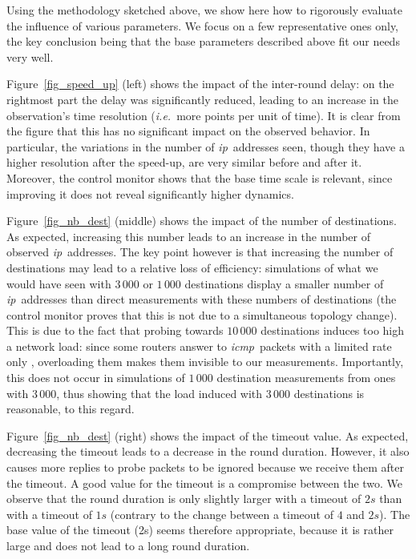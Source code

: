 \documentclass[times, 10pt,twocolumn]{article}
\newcommand{\ie}{{\em i.e.}}
\newcommand{\ip}{\mbox{\em \sc ip}}
\newcommand{\icmp}{{\em \sc icmp}}
\begin{document}
Using the methodology sketched above, we show here how to rigorously evaluate the influence of various parameters. We focus on a few representative ones only, the key conclusion being that the base parameters described above fit our needs very well.

Figure~\ref{fig_speed_up} (left) shows the impact of the inter-round delay: on the rightmost part the delay was significantly reduced, leading to an increase in the observation's time resolution (\ie\ more points per unit of time). It is clear from the figure that this has no significant impact on the observed behavior. In particular, the variations in the number of \ip\ addresses seen, though they have a higher resolution after the speed-up, are very similar before and after it. Moreover, the control monitor shows that the base time scale is relevant, since improving it does not reveal significantly higher dynamics.

Figure~\ref{fig_nb_dest} (middle) shows the impact of the number of
destinations. As expected, increasing this number leads to an increase
in the number of observed \ip\ addresses.
The key point however is that increasing
the number of destinations may lead to a relative loss of efficiency:
simulations of what we would have seen with $3\,000$ or $1\,000$
destinations display a smaller number of \ip\ addresses than direct
measurements with these numbers of destinations (the control monitor
proves that this is not due to a simultaneous topology change). This
is due to the fact that probing towards $10\,000$ destinations induces
too high a network load: since some routers answer to \icmp\ packets
with a limited rate only \cite{govindan2002estimating}, overloading
them makes them invisible to our measurements. Importantly, this does
not occur in simulations of $1\,000$ destination measurements from
ones with $3\,000$, thus showing that the load induced with $3\,000$
destinations is reasonable, to this regard.

Figure~\ref{fig_nb_dest} (right) shows the impact of the timeout value.
As expected, decreasing the timeout leads to a decrease in the round
duration.
However, it also causes more replies to probe packets to be ignored because we receive them after the timeout.
A good value for the timeout is a compromise
between the two. We observe that the round duration is only slightly
larger with a timeout of $2s$ than with a timeout of $1s$ (contrary to
the change between a timeout of $4$ and $2s$).  The base value of the
timeout (2s) seems therefore appropriate, because it is rather large
and does not lead to a long round duration.
\end{document}
